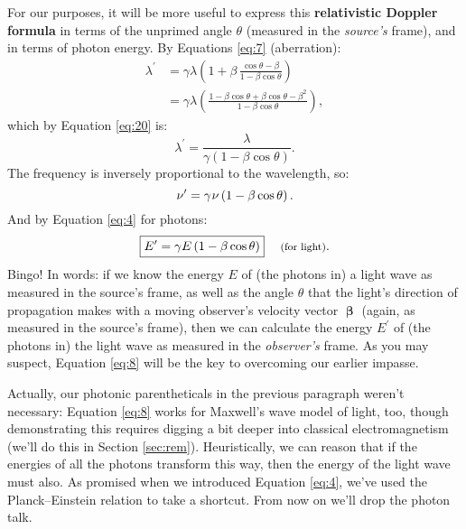 \documentclass[12pt]{article}
\newcommand{\vvbeta}{\bm{\upbeta}}
\begin{document}
For our purposes, it will be more useful to express this \textbf{relativistic Doppler formula} in terms of the unprimed angle $\theta$ (measured in the \emph{source's} frame), and in terms of photon energy. By Equations \ref{eq:7} (aberration):
\begin{equation*}
\begin{split}
\lambda^\prime &= \gamma \lambda \left( 1 + \beta \, \frac{\cos \theta - \beta}{1 - \beta \cos \theta} \right) \\[3pt]
&= \gamma \lambda \left( \frac{ 1 - \beta \cos \theta + \beta \cos \theta - \beta^2 }{1 - \beta \cos \theta} \right) ,
\end{split}
\end{equation*}
which by Equation \ref{eq:20} is:
\begin{equation}\label{eq:rdw}
\lambda^\prime = \frac{\lambda}{\gamma \left( 1 - \beta \cos \theta \right)}.
\end{equation}
The frequency is inversely proportional to the wavelength, so:
\begin{equation}\label{eq:rdf}
\nu^{\prime} = \gamma \mkern1mu \nu \left( 1- \beta \cos\theta \right).
\end{equation}
And by Equation \ref{eq:4} for photons:
\begin{equation}\label{eq:8}
\boxed{E^{\prime} = \gamma E \left(1-\beta \cos\theta\right)} \quad \text{\footnotesize{ (for light)}} .
\end{equation}
Bingo! In words: if we know the energy $E$ of (the photons in) a light wave as measured in the source's frame, as well as the angle $\theta$ that the light's direction of propagation makes with a moving observer's velocity vector $\vvbeta$ (again, as measured in the source's frame), then we can calculate the energy $E^\prime$ of (the photons in) the light wave as measured in the \emph{observer's} frame. As you may suspect, Equation \ref{eq:8} will be the key to overcoming our earlier impasse.

Actually, our photonic parentheticals in the previous paragraph weren't necessary: Equation \ref{eq:8} works for Maxwell's wave model of light, too, though demonstrating this requires digging a bit deeper into classical electromagnetism (we'll do this in Section \ref{sec:rem}). Heuristically, we can reason that if the energies of all the photons transform this way, then the energy of the light wave must also. As promised when we introduced Equation \ref{eq:4}, we've used the Planck--Einstein relation to take a shortcut. From now on we'll drop the photon talk.
\end{document}
